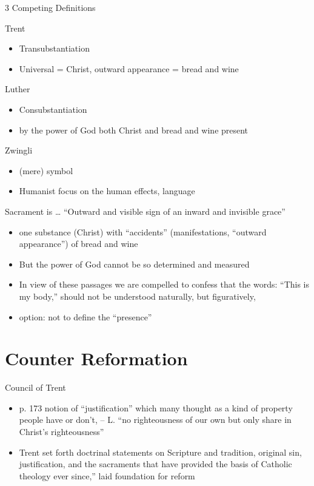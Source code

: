 \begin{frame}[label=sec-3-1]{3 Competing Definitions}
\begin{block}{Trent}
\begin{itemize}
\item Transubstantiation
\item Universal = Christ, outward appearance = bread and wine
\end{itemize}
\end{block}

\begin{block}{Luther}
\begin{itemize}
\item Consubstantiation
\item by the power of God both Christ and bread and wine present
\end{itemize}
\end{block}

\begin{block}{Zwingli}
\begin{itemize}
\item (mere) symbol
\item Humanist focus on the human effects, language
\end{itemize}
\end{block}
\end{frame}

\begin{frame}[label=sec-3-2]{Sacrament is \ldots{}}
``Outward and visible sign of an inward and invisible grace''
\begin{itemize}
\item one substance (Christ) with ``accidents'' (manifestations, ``outward appearance'') of bread and wine
\item But the power of God cannot be so determined and measured
\item In view of these passages we are compelled to confess that the words: ``This is my body,'' should not be understood naturally, but figuratively,
\item option: not to define the ``presence''
\end{itemize}
\end{frame}

\section{Counter Reformation}
\label{sec-4}
\begin{frame}[label=sec-4-1]{Council of Trent}
\begin{itemize}
\item p. 173 notion of ``justification'' which many thought as a kind of property people have or don't, -- L. ``no righteousness of our own but only share in Christ's righteousness''
\item Trent set forth doctrinal statements on Scripture and tradition, original sin, justification, and the sacraments that have provided the basis of Catholic theology ever since,'' laid foundation for reform
\end{itemize}
\end{frame}

